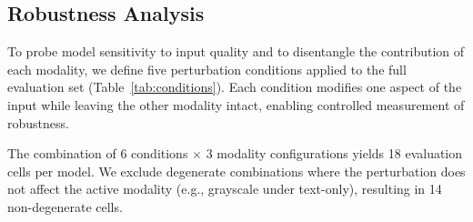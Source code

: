 
\subsection{Robustness Analysis}
\label{sec:robustness-results}

To probe model sensitivity to input quality and to disentangle the
contribution of each modality, we define five perturbation conditions
applied to the full evaluation set
(Table~\ref{tab:conditions}).  Each condition modifies one aspect of the
input while leaving the other modality intact, enabling controlled
measurement of robustness.

\begin{table}[t]
\centering
\caption{Perturbation conditions.  Each row describes a transformation
applied to all 2{,}379 samples before evaluation under the three modality
configurations.}
\label{tab:conditions}
\end{table}

\noindent
The combination of 6 conditions $\times$ 3 modality configurations yields
18 evaluation cells per model.  We exclude degenerate combinations where the
perturbation does not affect the active modality (e.g., grayscale under
text-only), resulting in 14 non-degenerate cells.

